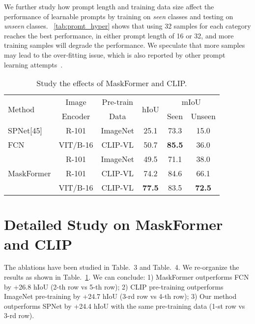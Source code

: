 \documentclass[runningheads]{llncs}
\begin{document}
We further study how prompt length and training data size affect the performance of learnable prompts by training on \emph{seen} classes and testing on \emph{unseen} classes. ~\cref{tab:promt_hyper} shows that using 32 samples for each category reaches the best performance, in either prompt length of 16 or 32, and more training samples will degrade the performance. We speculate that more samples may lead to the over-fitting issue, which is also reported by other prompt learning attempts~\cite{zhou2021learning}.


\begin{table}[]
    \footnotesize
    \centering
    \caption{\footnotesize Study the effects of MaskFormer and CLIP.}
    \begin{tabular}{l|c|c|c|c|c}
    \toprule
    \multirow{2}{*}{Method} & Image & Pre-train & \multirow{2}{*}{hIoU} & \multicolumn{2}{c}{mIoU}\\
    \cline{5-6}
    & Encoder & Data & & Seen & Unseen \\
     \hline
     SPNet[45] & \multirow{1}{*}{R-101} & \multirow{1}{*}{ImageNet} & \multirow{1}{*}{25.1} & \multirow{1}{*}{73.3} & \multirow{1}{*}{15.0}\\
     \hline
     \multirow{1}{*}{FCN} &  VIT/B-16 & CLIP-VL & 50.7 & \textbf{85.5} & 36.0 \\
     \hline
     \multirow{3}{*}{MaskFormer} & \multirow{1}{*}{R-101} & \multirow{1}{*}{ImageNet} & \multirow{1}{*}{49.5} & \multirow{1}{*}{71.1} & \multirow{1}{*}{38.0}\\
      & R-101 & CLIP-VL& 74.2 & 84.6 & 66.1 \\
      & VIT/B-16 & CLIP-VL & \textbf{77.5} & 83.5 & \textbf{72.5} \\
     \bottomrule
    \end{tabular}
    \label{tab:fair_pascal}
    \vspace{-1em}
\end{table}

\section{Detailed Study on MaskFormer and CLIP} 
The ablations have been studied in Table.~3 and Table.~4. We re-organize the results as shown in Table.~\ref{tab:fair_pascal}. We can conclude: 1) MaskFormer outperforms FCN by +26.8 hIoU (2-th row vs 5-th row); 2) CLIP pre-training outperforms ImageNet pre-training by +24.7 hIoU (3-rd row vs 4-th row); 3) Our method outperforms SPNet by +24.4 hIoU with the same pre-training data (1-st row vs 3-rd row).
\end{document}
